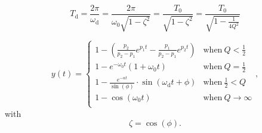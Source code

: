 \documentclass{article}[11pt]
\begin{document}
\begin{equation}\label{eq:td}
 T_{\mathrm{d}} = \frac{2\pi}{\omega_{\mathrm{d}}} 
                = \frac{2\pi}{\omega_0 \sqrt{1-\zeta^2}}
                = \frac{T_0}{\sqrt{1-\zeta^2}} 
                = \frac{T_0}{\sqrt{1-\frac{1}{4 Q^2}}}
\end{equation}

\begin{equation}
y(t)=
\begin{cases}
1-\left(\frac{p_2}{p_2-p_1} e^{p_1 t}-\frac{p_1}{p_2-p_1} e^{p_2 t}\right)             & \mathrm{when} \ Q <\frac{1}{2} \\
1 - e^{-\omega_0 t} (1+\omega_0 t)                                                     & \mathrm{when} \ Q = \frac{1}{2} \\
1-\frac{e^{-\alpha t}}{\sin(\phi)} \cdot \sin\left(\omega_{\mathrm{d}} t + \phi\right) & \mathrm{when} \ \frac{1}{2} < Q  \\
1 - \cos(\omega_0 t)                                                                   & \mathrm{when} \ Q \rightarrow \infty \\
\end{cases}, 
\end{equation}
with
\begin{equation}
\zeta = \cos(\phi).
\end{equation}
\end{document}
